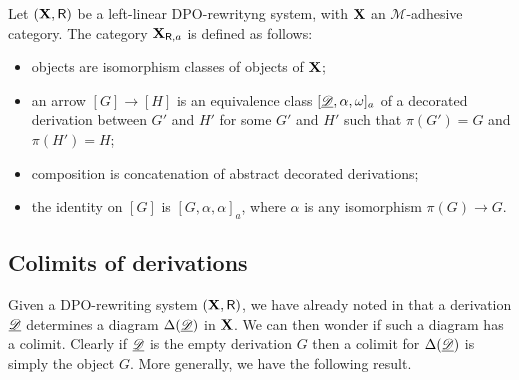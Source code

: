 \begin{definition}
	Let $(\textbf {\textup{X}}, \mathsf{R})$ be a left-linear DPO-rewrityng system, with $\textbf {\textup{X}}$ an $\mathcal{M}$-adhesive category. The  category $\textbf {\textup{X}}_{\mathsf{R}, a}$ is defined as follows:
	\begin{itemize}
		\item objects are isomorphism classes of objects of $\textbf {\textup{X}}$;
		\item an arrow $[G]\to [H]$ is an equivalence class $[\underline{\mathscr{D}}, \alpha, \omega]_a$ of a decorated derivation between $G'$ and $H'$ for some $G'$ and $H'$ such that $\pi(G')=G$ and $\pi(H')=H$;
		\item composition is concatenation of abstract decorated derivations;
		\item the identity on $[G]$ is $[G, \alpha, \alpha]_a$, where $\alpha$ is any isomorphism $\pi(G)\to G$.	\end{itemize}
\end{definition}


\subsection{Colimits of derivations}\label{subsec:col}
Given a DPO-rewriting system $(\textbf {\textup{X}}, \mathsf{R})$,  we have already noted in  that a derivation $\underline{\mathscr{D}}$  determines a diagram $\Delta(\underline{\mathscr{D}})$ in $\textbf {\textup{X}}$. We can then wonder if such a diagram has a colimit. Clearly if $\underline{\mathscr{D}}$ is the empty derivation $G$ then a colimit for $\Delta(\underline{\mathscr{D}})$ is simply the object $G$. More generally, we have the following result.

